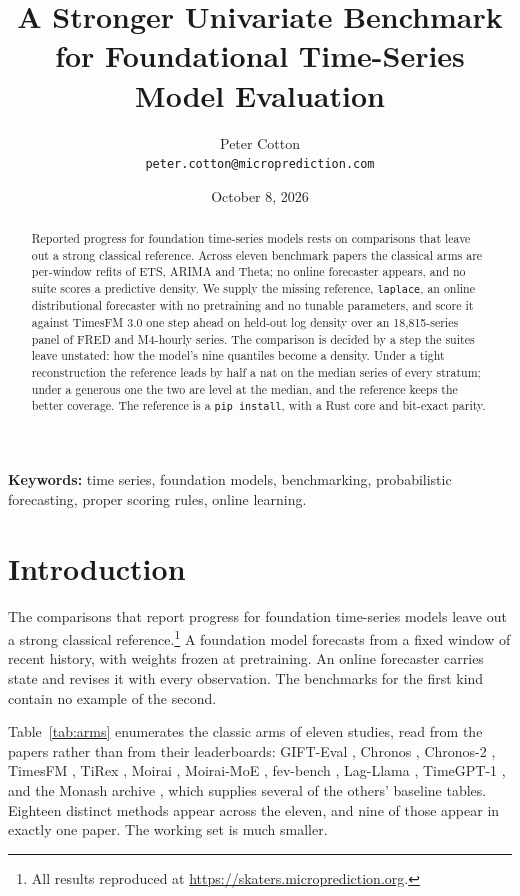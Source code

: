 \documentclass[article]{jss}
\author{
  Peter Cotton\\
  \texttt{peter.cotton@microprediction.com}
}
\title{A Stronger Univariate Benchmark for Foundational Time-Series Model Evaluation}
\date{October 8, 2026}
\providecommand{\proglang}[1]{\textsf{#1}}
\providecommand{\code}[1]{\texttt{#1}}
\newcommand{\paperabstract}{
Reported progress for foundation time-series models rests on comparisons that
leave out a strong classical reference. Across eleven benchmark papers the
classical arms are per-window refits of ETS, ARIMA and Theta; no online
forecaster appears, and no suite scores a predictive density. We supply the
missing reference, \code{laplace}, an online distributional forecaster with no
pretraining and no tunable parameters, and score it against TimesFM 3.0 one
step ahead on held-out log density over an 18{,}815-series panel of
\proglang{FRED} and M4-hourly series. The comparison is decided by a step the
suites leave unstated: how the model's nine quantiles become a density. Under
a tight reconstruction the reference leads by half a nat on the median series
of every stratum; under a generous one the two are level at the median, and
the reference keeps the better coverage. The reference is a \code{pip install},
with a \proglang{Rust} core and bit-exact parity.
}
\begin{document}
\maketitle

\begin{abstract}
\paperabstract
\end{abstract}

\noindent\textbf{Keywords:} time series, foundation models, benchmarking,
probabilistic forecasting, proper scoring rules, online learning.

\section{Introduction}\label{sec:intro}

The comparisons that report progress for foundation time-series models leave
out a strong classical reference.\footnote{All results reproduced at
\url{https://skaters.microprediction.org}.} A foundation model forecasts from a fixed
window of recent history, with weights frozen at pretraining. An online
forecaster carries state and revises it with every observation. The benchmarks
for the first kind contain no example of the second.

Table~\ref{tab:arms} enumerates the classic arms of eleven studies, read from
the papers rather than from their leaderboards: GIFT-Eval
\citep{aksu2024gifteval}, Chronos \citep{ansari2024chronos}, Chronos-2
\citep{ansari2025chronos2}, TimesFM \citep{das2024timesfm}, TiRex
\citep{auer2025tirex}, Moirai \citep{woo2024moirai}, Moirai-MoE
\citep{liu2024moiraimoe}, fev-bench \citep{shchur2025fevbench}, Lag-Llama
\citep{rasul2023lagllama}, TimeGPT-1 \citep{garza2023timegpt}, and the Monash
archive \citep{godahewa2021monash}, which supplies several of the others'
baseline tables. Eighteen distinct methods appear across the eleven, and nine of
those appear in exactly one paper. The working set is much smaller.
\end{document}
